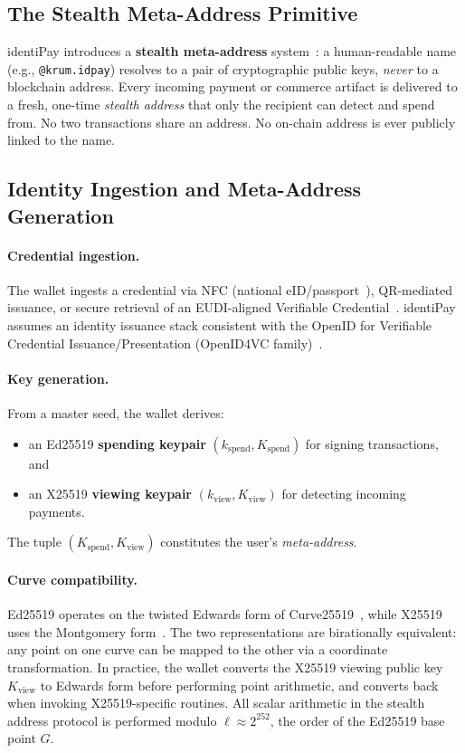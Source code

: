 \documentclass[11pt]{article}
\begin{document}
\subsection{The Stealth Meta-Address Primitive}
identiPay introduces a \textbf{stealth meta-address} system~\cite{buterin-stealth,eip5564}: a human-readable name (e.g., \texttt{@krum.idpay}) resolves to a pair of cryptographic public keys, \emph{never} to a blockchain address. Every incoming payment or commerce artifact is delivered to a fresh, one-time \emph{stealth address} that only the recipient can detect and spend from. No two transactions share an address. No on-chain address is ever publicly linked to the name.

\subsection{Identity Ingestion and Meta-Address Generation}
\paragraph{Credential ingestion.}
The wallet ingests a credential via NFC (national eID/passport~\cite{icao9303}), QR-mediated issuance, or secure retrieval of an EUDI-aligned Verifiable Credential~\cite{vc-data-model,eidas}. identiPay assumes an identity issuance stack consistent with the OpenID for Verifiable Credential Issuance/Presentation (OpenID4VC family)~\cite{oid4vci,oid4vp}.

\paragraph{Key generation.}
From a master seed, the wallet derives:
\begin{itemize}
  \item an Ed25519 \textbf{spending keypair} $(k_{\mathrm{spend}}, K_{\mathrm{spend}})$ for signing transactions, and
  \item an X25519 \textbf{viewing keypair} $(k_{\mathrm{view}}, K_{\mathrm{view}})$ for detecting incoming payments.
\end{itemize}
The tuple $(K_{\mathrm{spend}}, K_{\mathrm{view}})$ constitutes the user's \emph{meta-address}.

\paragraph{Curve compatibility.}
Ed25519 operates on the twisted Edwards form of Curve25519~\cite{ed25519}, while X25519 uses the Montgomery form~\cite{curve25519}. The two representations are birationally equivalent: any point on one curve can be mapped to the other via a coordinate transformation. In practice, the wallet converts the X25519 viewing public key $K_{\mathrm{view}}$ to Edwards form before performing point arithmetic, and converts back when invoking X25519-specific routines. All scalar arithmetic in the stealth address protocol is performed modulo $\ell \approx 2^{252}$, the order of the Ed25519 base point $G$.
\end{document}
